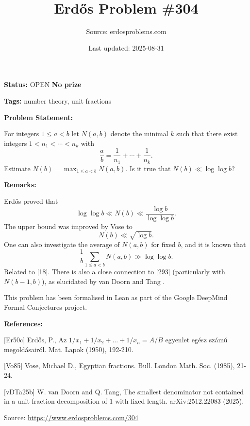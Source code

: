 \documentclass{article}
\title{Erd\H{o}s Problem \#304}
\date{Last updated: 2025-08-31}
\author{Source: erdosproblems.com}
\begin{document}
\maketitle

\noindent\textbf{Status:} OPEN \quad \textbf{No prize}

\noindent\textbf{Tags:} number theory, unit fractions

\medskip
\noindent\textbf{Problem Statement:}

For integers $1\leq a<b$ let $N(a,b)$ denote the minimal $k$ such that there exist integers $1<n_1<\cdots<n_k$ with\[\frac{a}{b}=\frac{1}{n_1}+\cdots+\frac{1}{n_k}.\]Estimate $N(b)=\max_{1\leq a<b}N(a,b)$. Is it true that $N(b) \ll \log\log b$?

\bigskip
\noindent\textbf{Remarks:}

Erd\H{o}s \cite{Er50c} proved that\[\log\log b \ll N(b) \ll \frac{\log b}{\log\log b}.\]The upper bound was improved by Vose \cite{Vo85} to\[N(b) \ll \sqrt{\log b}.\]One can also investigate the average of $N(a,b)$ for fixed $b$, and it is known that\[\frac{1}{b}\sum_{1\leq a<b}N(a,b) \gg \log\log b.\]Related to [18]. There is also a close connection to [293] (particularly with $N(b-1,b)$), as elucidated by van Doorn and Tang \cite{vDTa25b}.

This problem has been formalised in Lean as part of the Google DeepMind Formal Conjectures project.

\bigskip
\noindent\textbf{References:}

[Er50c] Erd\H{o}s, P., Az $1/x_1 + 1/x_2 + \ldots + 1/x_n =A/B$ egyenlet eg\'{e}sz sz\'{a}m\'{u} megold\'{a}sair\'{o}l. Mat. Lapok (1950), 192-210.
 
 [Vo85] Vose, Michael D., Egyptian fractions. Bull. London Math. Soc. (1985), 21-24.
 
 [vDTa25b] W. van Doorn and Q. Tang, The smallest denominator not contained in a unit fraction decomposition of 1 with fixed length. arXiv:2512.22083 (2025).

\bigskip
\noindent\small{Source: \url{https://www.erdosproblems.com/304}}
\end{document}
